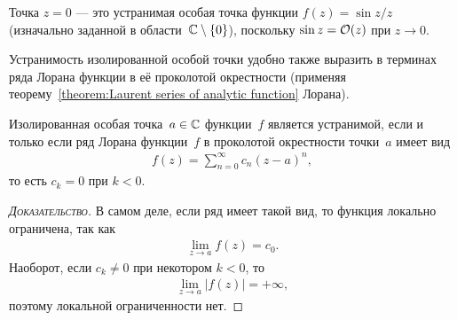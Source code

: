 \documentclass[../complex-analysis.tex]{subfiles}
\begin{document}
\begin{exmpl}
 Точка $ z=0 $ --- это устранимая особая точка функции $ f(z) = \sin z / z $ (изначально заданной в области~$ \mathbb{C} \setminus \left\{ 0 \right\} $), поскольку $ \sin z = \mathcal{O}(z) $ при $ z \to 0 $.
\end{exmpl}

Устранимость изолированной особой точки удобно также выразить в терминах ряда Лорана функции в её проколотой окрестности (применяя теорему~\ref{theorem:Laurent series of analytic function} Лорана).

\begin{crly}
 \label{corollary:Removable Singularity in Laurent Series}
 Изолированная особая точка~$ a\in\mathbb{C} $ функции~$ f $ является устранимой, если и только если ряд Лорана функции~$ f $ в проколотой окрестности точки~$ a $ имеет вид
 \begin{align*}
  f(z) = \sum_{n=0}^{\infty} c_n(z-a)^{n},
 \end{align*} то есть $ c_k = 0 $ при $ k < 0 $.
\end{crly}
\begin{proof}[\normalfont\textsc{Доказательство}]
 В самом деле, если ряд имеет такой вид, то функция локально ограничена, так как
 \begin{align*}
  \lim_{z \to a} f(z) = c_0.
 \end{align*} Наоборот, если $ c_k \neq 0 $ при некотором $ k < 0 $, то
 \begin{align*}
  \lim_{z \to a} \left| f(z) \right| = +\infty,
 \end{align*} поэтому локальной ограниченности нет.
\end{proof}
\end{document}

